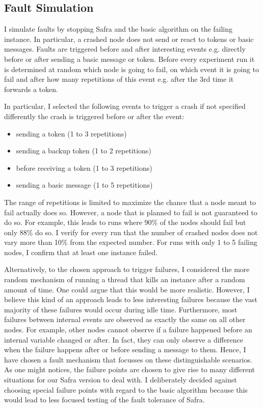 
\subsection{Fault Simulation}
I simulate faults by stopping Safra and the basic algorithm on the failing instance.
In particular, a crashed node does not send or react to tokens or basic messages.
Faults are triggered before and after interesting events e.g. directly before or after sending a basic message or token. 
Before every experiment run it is determined at random which node is going to fail, on which event it is going to fail and after how many repetitions of this event e.g. after the 3rd time it forwards a token.

In particular, I selected the following events to trigger a crash if not specified differently the crash is triggered before or after the event:
\begin{itemize}
	\item sending a token (1 to 3 repetitions)
	\item sending a backup token (1 to 2 repetitions)
	\item before receiving a token (1 to 3 repetitions)
	\item sending a basic message (1 to 5 repetitions)
\end{itemize}
The range of repetitions is limited to maximize the chance that a node meant to fail actually does so. 
However, a node that is planned to fail is not guaranteed to do so.
For example, this leads to runs where 90\% of the nodes should fail but only 88\% do so.
I verify for every run that the number of crashed nodes does not vary more than 10\% from the expected number. For runs with only 1 to 5 failing nodes, I confirm that at least one instance failed.

Alternatively, to the chosen approach to trigger failures, I considered the more random mechanism of running a thread that kills an instance after a random amount of time.
One could argue that this would be more realistic.
However, I believe this kind of an approach leads to less interesting failures because the vast majority of these failures would occur during idle time. 
Furthermore, most failures between internal events are observed as exactly the same on all other nodes. 
For example, other nodes cannot observe if a failure happened before an internal variable changed or after. 
In fact, they can only observe a difference when the failure happens after or before sending a message to them.
Hence, I have chosen a fault mechanism that focusses on these distinguishable scenarios.
As one might notices, the failure points are chosen to give rise to many different situations for our Safra version to deal with. 
I deliberately decided against choosing special failure points with regard to the basic algorithm because this would lead to less focused testing of the fault tolerance of Safra.

